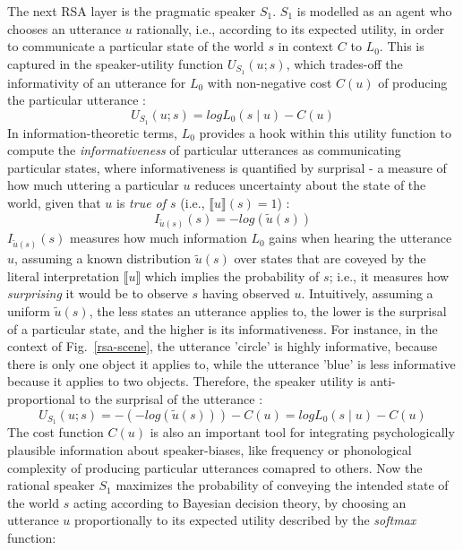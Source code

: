 The next RSA layer is the pragmatic speaker $S_1$. $S_1$ is modelled as an agent who chooses an utterance $u$ rationally, i.e., according to its expected utility, in order to communicate a particular state of the world $s$ in context $C$ to $L_0$. This is captured in the speaker-utility function $U_{S_1}(u; s)$, which trades-off the informativity of an utterance for $L_0$ with non-negative cost $C(u)$ of producing the particular utterance \parencite{problang}:
\begin{equation}
U_{S_1} (u;s) = log L_0(s \mid u) - C(u)
\end{equation}
In information-theoretic terms, $L_0$ provides a hook within this utility function to compute the \emph{informativeness} of particular utterances as communicating particular states, 
where informativeness is quantified by surprisal - a measure of how much uttering a particular $u$ reduces uncertainty about the state of the world, given that $u$ is \emph{true of $s$} (i.e., $\llbracket u \rrbracket (s) = 1$) \parencite{frank2012predicting}: 
\begin{equation}
I_{ \tilde{u} (s)}(s) = -log(\tilde{u} (s))
\end{equation}
$I_{\tilde{u} (s)}(s)$ measures how much information $L_0$ gains when hearing the utterance $u$, assuming a known distribution $\tilde{u} (s)$ over states that are coveyed by the literal interpretation $\llbracket u \rrbracket$ which implies the probability of $s$; i.e., it measures how \emph{surprising} it would be to observe $s$ having observed $u$.
Intuitively, assuming a uniform $\tilde{u} (s)$, the less states an utterance applies to, the lower is the surprisal of a particular state, and the higher is its informativeness. For instance, in the context of Fig.~\ref{rsa-scene}, the utterance 'circle' is highly informative, because there is only one object it applies to, while the utterance 'blue' is less informative because it applies to two objects. 
Therefore, the speaker utility is anti-proportional to the surprisal of the utterance \parencite{frank2012predicting}:
\begin{equation}
U_{S_1} (u;s) = -(-log(\tilde{u}(s))) - C(u) = log L_0(s \mid u) - C(u)
\end{equation}
The cost function $C(u)$ is also an important tool for integrating psychologically plausible information about speaker-biases, like frequency or phonological complexity of producing particular utterances comapred to others. Now the rational speaker $S_1$ maximizes the probability of conveying the intended state of the world $s$ acting according to Bayesian decision theory, by choosing an utterance $u$ proportionally to its expected utility described by the \emph{softmax} function:
